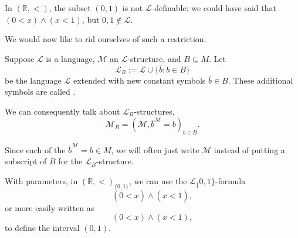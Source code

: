 \documentclass[notoc,notitlepage]{tufte-book}
\begin{document}
\begin{eg}
  In $(\mathbb{R}, <)$, the subset $(0, 1)$ is not $\mathcal{L}$-definable: we could have said that $(0 < x) \land (x < 1)$, but $0, 1 \notin \mathcal{L}$.
\end{eg}

We would now like to rid ourselves of such a restriction.

\begin{defn}[Parameters]\label{defn:parameters}
  Suppose $\mathcal{L}$ is a language, $\mathcal{M}$ an $\mathcal{L}$-structure, and $B \subseteq M$. Let
  \begin{equation*}
    \mathcal{L}_B := \mathcal{L} \cup \{ \bar{b} : b \in B \}
  \end{equation*}
  be the language $\mathcal{L}$ extended with new constant symbols $\bar{b} \in B$. These additional symbols are called .
\end{defn}

We can consequently talk about $\mathcal{L}_B$-structures,
\begin{equation*}
  \mathcal{M}_B = (\mathcal{M}, \bar{b}^\mathcal{M} = b)_{b \in B}.
\end{equation*}

\begin{remark}
  Since each of the $\bar{b}^\mathcal{M} = b \in M$, we will often just write $\mathcal{M}$ instead of putting a subscript of $B$ for the $\mathcal{L}_B$-structure.
\end{remark}

\begin{eg}
  With parameters, in $(\mathbb{R}, <)_{\{ 0, 1 \}}$, we can use the $\mathcal{L}_\{0, 1\}$-formula
  \begin{equation*}
    (\bar{0} < x) \land (x < \bar{1}),
  \end{equation*}
  or more easily written as
  \begin{equation*}
    (0 < x) \land (x < 1),
  \end{equation*}
  to define the interval $(0, 1)$.
\end{eg}
\end{document}
